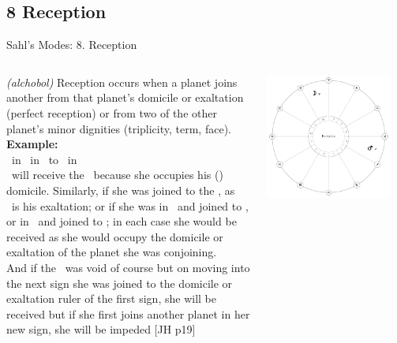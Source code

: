 \subsection{8 Reception}
\begin{frame}[t]{Sahl's Modes: 8. Reception}
\small
\begin{columns}[T, onlytextwidth]
\textsl{(alchobol)} Reception occurs when a planet joins another from that planet's domicile or exaltation (perfect reception) or from two of the other planet's minor dignities (triplicity, term, face). \\

\vspace{0.25cm}
\textbf{Example:} \\
\ul
\Moon\ in \Aries\ in \Trine\ to \Mars\ in \Sagittarius \\

\vspace{0.25cm}
\Mars\ will receive the \Moon\ because she occupies his (\Mars) domicile. Similarly, if she was joined to the \Sun, as \Aries\ is his exaltation; or if she was in \Taurus\ and joined to \Venus, or in \Gemini\ and joined to \Mercury; in each case she would be received as she would occupy the domicile or exaltation of the planet she was conjoining. \\

\vspace{0.25cm}
And if the \Moon\ was void of course but on moving into the next sign she was joined to the domicile or exaltation ruler of the first sign, she will be received but if she first joins another planet in her new sign, she will be impeded [JH p19]


\begin{center}
{\includegraphics[width=0.9\textwidth]{charts/65-reception}} \\
\end{center}
\end{columns}
\end{frame}
